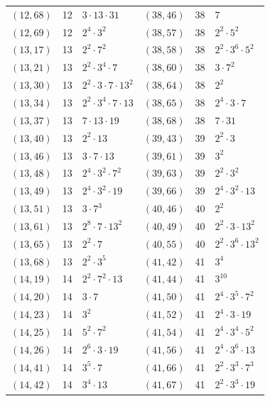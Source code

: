 \documentclass[11pt]{article}
\begin{document}
\begin{longtable}{@{}lrl@{\qquad}lrl@{}}
$(12,68)$ & 12 & $3\cdot 13\cdot 31$ & $(38,46)$ & 38 & $7$\\
$(12,69)$ & 12 & $2^{4}\cdot 3^{2}$ & $(38,57)$ & 38 & $2^{2}\cdot 5^{2}$\\
$(13,17)$ & 13 & $2^{2}\cdot 7^{2}$ & $(38,58)$ & 38 & $2^{2}\cdot 3^{6}\cdot 5^{2}$\\
$(13,21)$ & 13 & $2^{2}\cdot 3^{4}\cdot 7$ & $(38,60)$ & 38 & $3\cdot 7^{2}$\\
$(13,30)$ & 13 & $2^{2}\cdot 3\cdot 7\cdot 13^{2}$ & $(38,64)$ & 38 & $2^{2}$\\
$(13,34)$ & 13 & $2^{2}\cdot 3^{4}\cdot 7\cdot 13$ & $(38,65)$ & 38 & $2^{4}\cdot 3\cdot 7$\\
$(13,37)$ & 13 & $7\cdot 13\cdot 19$ & $(38,68)$ & 38 & $7\cdot 31$\\
$(13,40)$ & 13 & $2^{2}\cdot 13$ & $(39,43)$ & 39 & $2^{2}\cdot 3$\\
$(13,46)$ & 13 & $3\cdot 7\cdot 13$ & $(39,61)$ & 39 & $3^{2}$\\
$(13,48)$ & 13 & $2^{4}\cdot 3^{2}\cdot 7^{2}$ & $(39,63)$ & 39 & $2^{2}\cdot 3^{2}$\\
$(13,49)$ & 13 & $2^{4}\cdot 3^{2}\cdot 19$ & $(39,66)$ & 39 & $2^{4}\cdot 3^{2}\cdot 13$\\
$(13,51)$ & 13 & $3\cdot 7^{3}$ & $(40,46)$ & 40 & $2^{2}$\\
$(13,61)$ & 13 & $2^{8}\cdot 7\cdot 13^{2}$ & $(40,49)$ & 40 & $2^{2}\cdot 3\cdot 13^{2}$\\
$(13,65)$ & 13 & $2^{2}\cdot 7$ & $(40,55)$ & 40 & $2^{2}\cdot 3^{6}\cdot 13^{2}$\\
$(13,68)$ & 13 & $2^{2}\cdot 3^{5}$ & $(41,42)$ & 41 & $3^{4}$\\
$(14,19)$ & 14 & $2^{2}\cdot 7^{2}\cdot 13$ & $(41,44)$ & 41 & $3^{10}$\\
$(14,20)$ & 14 & $3\cdot 7$ & $(41,50)$ & 41 & $2^{4}\cdot 3^{5}\cdot 7^{2}$\\
$(14,23)$ & 14 & $3^{2}$ & $(41,52)$ & 41 & $2^{4}\cdot 3\cdot 19$\\
$(14,25)$ & 14 & $5^{2}\cdot 7^{2}$ & $(41,54)$ & 41 & $2^{4}\cdot 3^{4}\cdot 5^{2}$\\
$(14,26)$ & 14 & $2^{6}\cdot 3\cdot 19$ & $(41,56)$ & 41 & $2^{4}\cdot 3^{6}\cdot 13$\\
$(14,41)$ & 14 & $3^{5}\cdot 7$ & $(41,66)$ & 41 & $2^{2}\cdot 3^{3}\cdot 7^{3}$\\
$(14,42)$ & 14 & $3^{4}\cdot 13$ & $(41,67)$ & 41 & $2^{2}\cdot 3^{3}\cdot 19$\\

\end{longtable}
\end{document}
